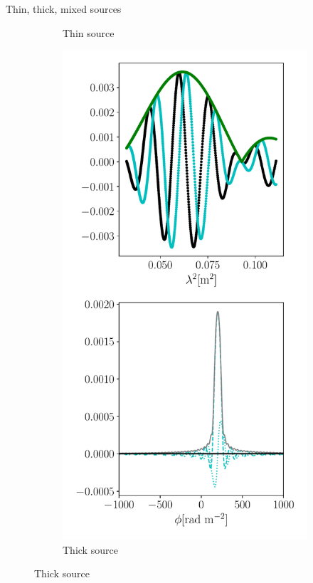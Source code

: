 \documentclass[xetex,aspectratio=169]{beamer}
\begin{document}
\begin{frame}{Thin, thick, mixed sources}
\begin{figure}
\begin{subfigure}{0.2\textwidth}
			\caption{Thin source}
		\end{subfigure}
		\begin{subfigure}{0.2\textwidth}
			\includegraphics[width=\textwidth]{figures/sources/thick_source.pdf}
			\caption{Thick source}

\end{subfigure}
\end{figure}
\end{frame}
\end{document}
